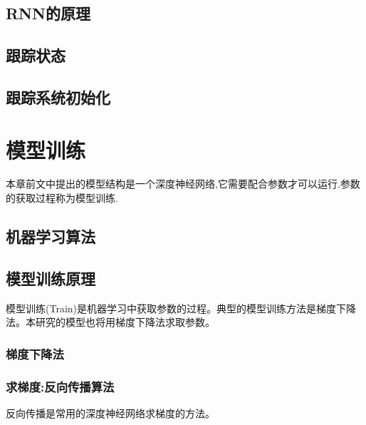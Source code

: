\subsection{RNN的原理}
\subsection{跟踪状态}
\subsection{跟踪系统初始化}


\section{模型训练}
本章前文中提出的模型结构是一个深度神经网络,它需要配合参数才可以运行.参数的获取过程称为模型训练.

\subsection{机器学习算法}

\subsection{模型训练原理}
模型训练(Train)是机器学习中获取参数的过程。典型的模型训练方法是梯度下降法。本研究的模型也将用梯度下降法求取参数。
\subsubsection{梯度下降法}

\subsubsection{求梯度:反向传播算法}
反向传播是常用的深度神经网络求梯度的方法。